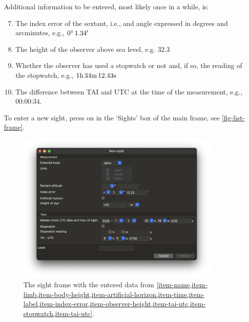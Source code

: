 \documentclass{ol-softwaremanual}
\begin{document}
Additional information to be entered, most likely once in a while, is: 

\begin{enumerate}
  \setcounter{enumi}{6}
  \item \label{item-index-error} The index error of the sextant,  i.e., and angle expressed in degrees and arcminutes, e.g., $0 \degree \, 1.34'$
  \item \label{item-observer-height} The height of the observer above sea level, e.g. $32.3$ \ft
  \item \label{item-stopwatch} Whether the observer has used a stopwatch or not and, if so, the reading of the stopwatch, e.g., $1\textrm{h} \, 34 \textrm{m} \, 12.43 \textrm{s}$
  \item \label{item-tai-utc} The difference between \ac{TAI} and \ac{UTC} at the time of the measurement, e.g., $00$:$00$:$34$. 
\end{enumerate}

To enter a new sight, press on  in the `Sights' box of the main frame, see \cref{fig-list-frame}. 



\begin{figure}
  \centering
  \includegraphics[width=0.9\textwidth]{figures/sight-frame.png}
  \caption{
    \label{fig-sight-frame}
    The sight frame with the entered data from \cref{item-name,item-limb,item-body-height,item-artificial-horizon,item-time,item-label,item-index-error,item-observer-height,item-tai-utc,item-stopwatch,item-tai-utc}. 
  }
  \end{figure}



\printacronyms[pages={display=all,seq/use=false}]


\end{document}

